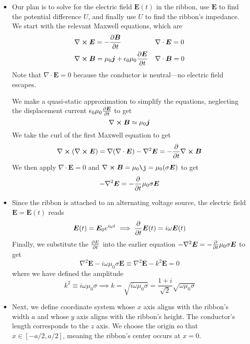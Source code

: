 \documentclass[11pt, a4paper]{article}
\renewcommand{\vec}[1]{\bm{#1}} %
\newcommand{\E}{\vec{E}}  %
\newcommand{\B}{\vec{B}}  %
\newcommand{\ee}{\epsilon_{0}}  %
\newcommand{\mm}{\mu_{0}}  %
\newcommand{\m}{\vec{m}}  %
\renewcommand{\div}{\nabla \cdot}
\renewcommand{\curl}{\nabla \cross}
\renewcommand{\grad}{\nabla}
\renewcommand{\laplacian}{\nabla^{2}}
\begin{document}
\begin{itemize}
	\item Our plan is to solve for the electric field $ \E(t) $ in the ribbon, use $ \E $ to find the potential difference $ U $, and finally use $ U $ to find the ribbon's impedance. We start with the relevant Maxwell equations, which are
	\begin{align*}
		& \curl \E = - \pdv{\B}{t} && \div \E = 0\\
		& \curl \B = \mm \vec{j} + \ee\mm \pdv{\E}{t} && \div \B = 0
	\end{align*}
	Note that $ \div \E = 0 $ because the conductor is neutral---no electric field escapes.
	
	We make a quasi-static approximation to simplify the equations, neglecting the displacement current $  \ee\mm \pdv{\E}{t} $ to get
	\begin{equation*}
		 \curl \B \approx \mm \vec{j}
	\end{equation*}
	We take the curl of the first Maxwell equation to get 
	\begin{equation*}
		\curl (\curl \E) = \grad (\div \E) - \laplacian \E  = - \pdv{t} \curl \B
	\end{equation*}
	We then apply $ \div \E = 0 $ and $ \curl \B = \mm \j = \mm (\sigma \E) $ to get
	\begin{equation*}
		- \laplacian \E = - \pdv{t} \mm \sigma \E
	\end{equation*}
	
	\item Since the ribbon is attached to an alternating voltage source, the electric field $ \E = \E(t) $ reads
	\begin{equation*}
		\E(t) = \E_{0} e^{i\omega t} \implies \pdv{t}\E(t) = i \omega \E(t)
	\end{equation*}
	Finally, we substitute the $ \pdv{E}{t} $ into the earlier equation $ - \laplacian \E = - \pdv{t} \mm \sigma \E $ to get
	\begin{equation*}
		\laplacian \E - i \omega \mm \sigma \E \equiv \laplacian \E - k^{2}\E = 0
	\end{equation*}
	where we have defined the amplitude
	\begin{equation*}
		k^{2} \equiv i \omega \mm \sigma \implies k = \sqrt{i \omega \mm \sigma} = \frac{1 + i}{\sqrt{2}}\sqrt{\omega \mm \sigma}
	\end{equation*}
	
	
	\item Next, we define coordinate system whose $ x $ axis aligns with the ribbon's width $ a $ and whose $ y $ axis aligns with the ribbon's height. The conductor's length corresponds to the $ z $ axis. We choose the origin so that $ x \in [-a/2, a/2] $, meaning the ribbon's center occurs at $ x = 0 $. 
	

\end{itemize}
\end{document}
